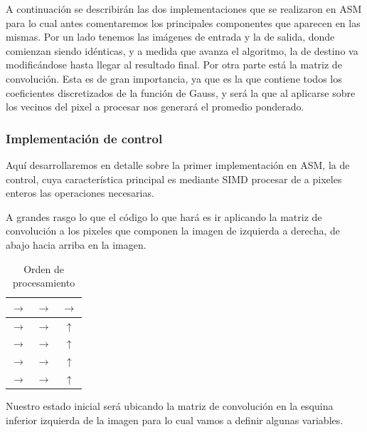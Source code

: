 A continuación se describirán las dos implementaciones que se realizaron en ASM
para lo cual antes comentaremos los principales componentes que aparecen
en las mismas. Por un lado tenemos las imágenes de entrada y la de salida, donde
comienzan siendo idénticas, y a medida que avanza el algoritmo, la de destino va
modificándose hasta llegar al resultado final. Por otra parte está la matriz de
convolución. Esta es de gran importancia, ya que es la que contiene todos los
coeficientes discretizados de la función de Gauss, y será la que al aplicarse
sobre los vecinos del pixel a procesar nos generará el promedio ponderado.

\subsubsection{Implementación de control}

Aquí desarrollaremos en detalle sobre la primer implementación en ASM, la de
control, cuya característica principal es mediante SIMD procesar de a pixeles
enteros las operaciones necesarias.

A grandes rasgo lo que el código lo que hará es ir aplicando la matriz de convolución a los pixeles que
componen la imagen de izquierda a derecha, de abajo hacia
arriba en la imagen.

\begin{table}[H]
	\centering
	\begin{tabular}{|ccc|}
		\hline
		$\longrightarrow$ & $\longrightarrow$ & $\longrightarrow$ \\ \hline
		$\longrightarrow$ & $\longrightarrow$ & $\uparrow$ \\ \hline
		$\longrightarrow$ & $\longrightarrow$ & $\uparrow$ \\ \hline
		$\longrightarrow$ & $\longrightarrow$ & $\uparrow$ \\ \hline
		$\longrightarrow$ & $\longrightarrow$ & $\uparrow$ \\ \hline
	\end{tabular}
	\caption{Orden de procesamiento}
\end{table}

Nuestro estado inicial será ubicando la matriz de convolución en la esquina
inferior izquierda de la imagen para lo cual vamos a definir algunas variables.


